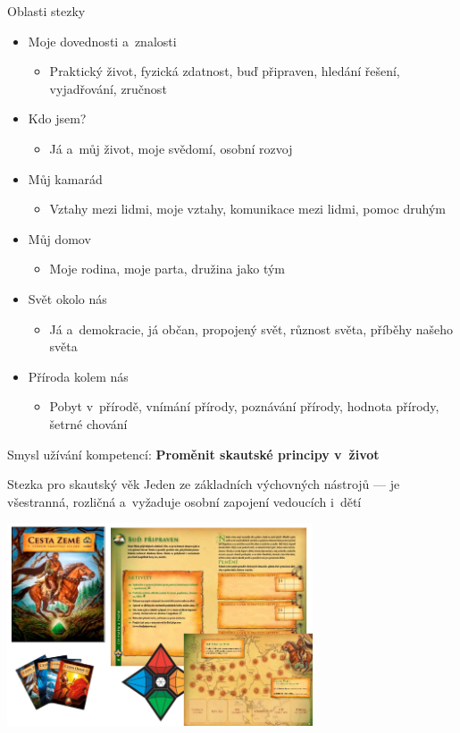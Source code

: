 \documentclass[hyperref={bookmarks=true, unicode=true, colorlinks=true, plainpages=false, pdfkeywords={Skaut, Junak, Skauting, Vychovna metoda}, linkcolor=OrangeRed, anchorcolor=OrangeRed, citecolor=RawSienna, filecolor=RawSienna, menucolor=OrangeRed, urlcolor=RawSienna, pdftex}, compress, xelatex, xcolor=dvipsnames, print]{beamer}
\begin{document}
\begin{frame}{Oblasti stezky}
\begin{itemize}
\item Moje dovednosti a~znalosti
 \begin{itemize}
 \item Praktický život, fyzická zdatnost, buď připraven, hledání řešení, vyjadřování, zručnost
 \end{itemize}
\item Kdo jsem?
 \begin{itemize}
 \item Já a~můj život, moje svědomí, osobní rozvoj
 \end{itemize}
\item Můj kamarád
 \begin{itemize}
 \item Vztahy mezi lidmi, moje vztahy, komunikace mezi lidmi, pomoc druhým
 \end{itemize}
\item Můj domov
 \begin{itemize}
 \item Moje rodina, moje parta, družina jako tým
 \end{itemize}
\item Svět okolo nás
 \begin{itemize}
 \item Já a~demokracie, já občan, propojený svět, různost světa, příběhy našeho světa
 \end{itemize}
\item Příroda kolem nás
 \begin{itemize}
 \item Pobyt v~přírodě, vnímání přírody, poznávání přírody, hodnota přírody, šetrné chování
 \end{itemize}
\end{itemize}
Smysl užívání kompetencí: \textbf{Proměnit skautské principy v~život}
\end{frame}

\begin{frame}{Stezka pro skautský věk}
Jeden ze základních výchovných nástrojů --- je všestranná, rozličná a~vyžaduje osobní zapojení vedoucích i~dětí
\begin{center}
\includegraphics[height=6cm]{stezka.png}
\end{center}
\end{frame}
\end{document}
